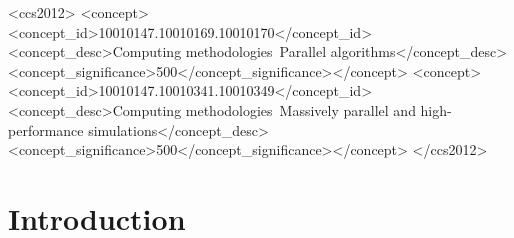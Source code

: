 \documentclass[sigconf,nonacm]{acmart}
\begin{document}
\begin{abstract}
We evaluate it on the residual and matrix-free Jacobian action of a colocated CVFEM
Navier--Stokes discretisation on an NVIDIA Grace CPU. On \campDofs{} degrees of freedom the
packed residual reaches \campResPacked{}~MDOF/s against \campSpmvF{} for a sparse
matrix--vector product with the lagged matrix. The mesh the sweep reads is \fpImpl{}~bytes per
degree of freedom and the matrix the product streams \fpMatrixFSixFour{}; the matched traffic comparison includes cached geometry and field vectors as well. The Jacobian
action is reported in both forms, since they are not the same operator: lagged, it is what the
matrix holds, at $\jfLaggedVsF\times$ the product; differentiated, what a Newton--Krylov solve
applies, it costs $\jfExactCost\times$ and is $\jfExactVsF\times$. A controlled residual
experiment finds lower accumulation costs for the packed layout at both one and 72 threads.
The single-thread advantage therefore cannot be attributed solely to input staging.
For a fixed perturbed state, a coefficient-cached consistent Darwish action is
$\cmCsrSpeedup\times$ faster than an equivalent assembled CSR application on
the measured affine fixture.
\end{abstract}

\begin{CCSXML}
<ccs2012>
<concept><concept_id>10010147.10010169.10010170</concept_id>
<concept_desc>Computing methodologies~Parallel algorithms</concept_desc>
<concept_significance>500</concept_significance></concept>
<concept><concept_id>10010147.10010341.10010349</concept_id>
<concept_desc>Computing methodologies~Massively parallel and high-performance simulations</concept_desc>
<concept_significance>500</concept_significance></concept>
</ccs2012>
\end{CCSXML}


\maketitle

\section{Introduction}
\label{sec:intro}
\end{document}
